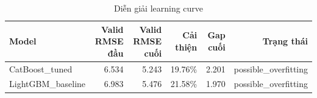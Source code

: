 \begin{table}[H]
\centering
\caption{Diễn giải learning curve}
\label{tab:learning-curve-interpretation}
\scriptsize
\setlength{\tabcolsep}{4pt}
\renewcommand{\arraystretch}{0.92}
\begin{tabular}{lrrrrr}
\toprule
Model & Valid RMSE đầu & Valid RMSE cuối & Cải thiện & Gap cuối & Trạng thái \\
\midrule
CatBoost\_tuned & 6.534 & 5.243 & 19.76\% & 2.201 & possible\_overfitting \\
LightGBM\_baseline & 6.983 & 5.476 & 21.58\% & 1.970 & possible\_overfitting \\
\bottomrule
\end{tabular}
\end{table}
